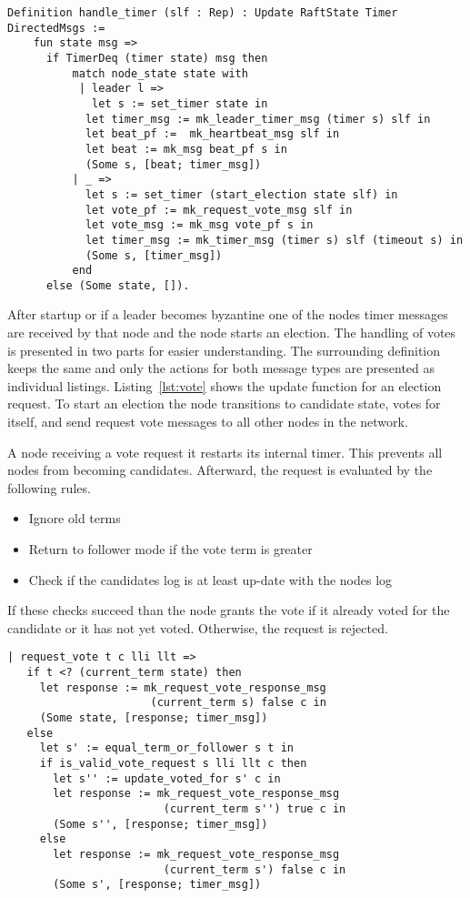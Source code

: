 \begin{lstlisting}[style=coq,label=lst:timer,
caption=The implementation of handling timer messages.]
  Definition handle_timer (slf : Rep) : Update RaftState Timer DirectedMsgs :=
    fun state msg =>
      if TimerDeq (timer state) msg then
          match node_state state with
           | leader l =>
             let s := set_timer state in
            let timer_msg := mk_leader_timer_msg (timer s) slf in
            let beat_pf :=  mk_heartbeat_msg slf in
            let beat := mk_msg beat_pf s in
            (Some s, [beat; timer_msg])
          | _ =>
            let s := set_timer (start_election state slf) in
            let vote_pf := mk_request_vote_msg slf in
            let vote_msg := mk_msg vote_pf s in
            let timer_msg := mk_timer_msg (timer s) slf (timeout s) in
            (Some s, [timer_msg])
          end
      else (Some state, []).
\end{lstlisting}

After startup or if a leader becomes byzantine one of the nodes timer messages
are received by that node and the node starts an election.
The handling of votes is presented in two parts for easier understanding.
The surrounding definition keeps the same and only the actions for both
message types are presented as individual listings.
Listing~\ref{lst:vote} shows the update function for an election request.
To start an election the node transitions to candidate state, votes for
itself, and send request vote messages to all other nodes in the network.

A node receiving a vote request it restarts its internal timer. This prevents
all nodes from becoming candidates. Afterward, the request is evaluated by the
following rules.
\begin{itemize}
  \item Ignore old terms
  \item Return to follower mode if the vote term is greater
  \item Check if the candidates log is at least up-date with the nodes log
\end{itemize}

If these checks succeed than the node grants the vote if it already voted
for the candidate or it has not yet voted. Otherwise, the request is
rejected.

\begin{lstlisting}[style=coq,label=lst:vote,
caption=Handle a vote request.]
 | request_vote t c lli llt =>
   if t <? (current_term state) then
     let response := mk_request_vote_response_msg 
                      (current_term s) false c in
     (Some state, [response; timer_msg])
   else
     let s' := equal_term_or_follower s t in
     if is_valid_vote_request s lli llt c then
       let s'' := update_voted_for s' c in
       let response := mk_request_vote_response_msg 
                        (current_term s'') true c in
       (Some s'', [response; timer_msg])
     else
       let response := mk_request_vote_response_msg 
                        (current_term s') false c in
       (Some s', [response; timer_msg])
\end{lstlisting}

